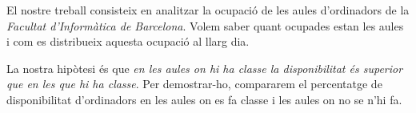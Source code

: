 \documentclass[a4paper, 12pt]{article}
\begin{document}
El nostre treball consisteix en analitzar la ocupació de les aules d'ordinadors de la \emph{Facultat d'Informàtica de Barcelona}. Volem saber quant ocupades estan les aules i com es distribueix aquesta ocupació al llarg dia.

La nostra hipòtesi és que \emph{en les aules on hi ha classe la disponibilitat és superior que en les que hi ha classe}. Per demostrar-ho, compararem el percentatge de disponibilitat d'ordinadors en les aules on es fa classe i les aules on no se n'hi fa.






\end{document}
